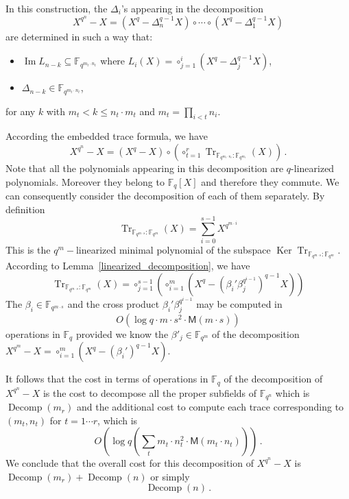 \documentclass{sig-alternate}
\newcommand{\ff}[1]{\mathbb{F}_{#1}}
\newcommand{\qq}{q}
\newcommand{\nn}{n}
\newcommand{\qn}{{\qq^\nn}}
\newcommand{\basef}{\ff{\qq}}
\newcommand{\extf}{\ff{\qn}}
\DeclareMathOperator{\Tr}{Tr}
\DeclareMathOperator{\Ker}{Ker}
\DeclareMathOperator{\Ima}{Im}
\DeclareMathOperator{\Decomp}{Decomp}
\newcommand{\tr}[2]{\Tr_{\ff{#1}:\ff{#2}}}
\newcommand{\bigO}{O}
\newcommand{\Mul}{\mathsf{M}}
\begin{document}



\medskip

In this construction, the $\Delta_i$'s appearing in the decomposition
$$X^{\qq^\nn}-X=(X^\qq-\Delta_n^{\qq-1} X) \circ  \cdots \circ (X^\qq-\Delta_1^{\qq-1} X) $$
are determined in such a way that:
\begin{itemize}
\item $\Ima L_{n-k} \subseteq \mathbb{F}_{\qq^{m_t \cdot n_t}}$ where $L_{i}(X)=\circ_{j=1}^{i} (X^q-\Delta_j^{q-1} X)$,
\item $\Delta_{n-k} \in \mathbb{F}_{\qq^{m_t \cdot n_t}}$,
\end{itemize}
for any $k$ with $m_{t}< k \le n_t \cdot m_{t}$ and $m_t=\prod_{i < t} n_i$. 

\medskip

According the embedded trace formula, we have
 \begin{equation}
 \label{decomp_trace}
 X^{\qq^{\nn}}-X=(X^{\qq}-X) \circ \left( \circ_{t=1}^r  \tr{\qq^{m_t \cdot n_t}}{\qq^{m_{t}}}(X) \right)     \,. 
\end{equation}
Note that all the polynomials appearing in this decomposition are $q$-linearized polynomials. Moreover they belong to $\basef[X]$ and therefore they commute.
 We can consequently consider the decomposition of each of them separately. By definition
 $$  \tr{\qq^{m \cdot s}}{\qq^{m}}(X) =\sum_{i=0}^{s-1} X^{\qq^{m\cdot i}}  $$
This is the $\qq^{m}-$linearized minimal polynomial of the subspace $\Ker \tr{\qq^{m \cdot s}}{\qq^{m}}$. According to Lemma~\ref{linearized_decomposition}, we have
\begin{equation}
\label{decomposition_trace}
\tr{\qq^{m \cdot s}}{\qq^{m}}(X)=\circ_{j=1}^{s-1} \left( \circ_{i=1}^{m} (X^\qq-(\beta_i'  \beta_j^{\qq^{i-1}})^{q-1}   X) \right)
\end{equation}
The $\beta_i \in \mathbb{F}_{\qq^{m \cdot s}}$ and the cross product $\beta_i'  \beta_j^{\qq^{i-1}}$ may be computed in 
$$\bigO(\log q \cdot m \cdot s^2 \cdot \Mul(m \cdot s))$$
operations in $\basef$ provided we know the $\beta'_j \in \mathbb{F}_{\qq^m}$ of the decomposition $X^{\qq^{m}}-X=\circ_{i=1}^{m} (X^{\qq}-(\beta_i')^{\qq-1} X)$.

It follows that the cost in terms of operations in $\basef$ of the decomposition of $X^{\qq^\nn}-X$ is the cost to decompose all the proper subfields of $\extf$ which is $\Decomp(m_r)$ and the additional cost to compute each trace corresponding to $(m_t,n_t)$ for $t=1 \cdots r $, which is 
$$\bigO\left(\log q \left( \sum _t m_t \cdot n_t^2 \cdot \Mul(m_t \cdot n_t) \right) \right)\,.$$
We conclude that the overall cost for this decomposition of $X^{\qq^\nn}-X$ is $\Decomp(m_r)+\Decomp(\nn)$ or simply 
$$\Decomp(\nn) \,.$$
\end{document}

